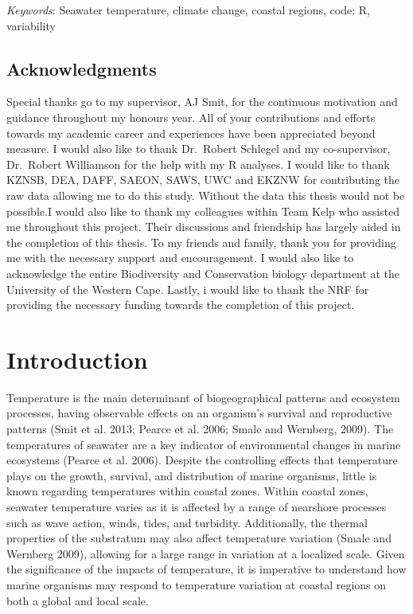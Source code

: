 \documentclass[12pt,]{article}
\begin{document}
\emph{Keywords}: Seawater temperature, climate change, coastal regions,
code: R, variability

\newpage

\subsection{Acknowledgments}\label{acknowledgments}

Special thanks go to my supervisor, AJ Smit, for the continuous
motivation and guidance throughout my honours year. All of your
contributions and efforts towards my academic career and experiences
have been appreciated beyond measure. I would also like to thank
Dr.~Robert Schlegel and my co-supervisor, Dr.~Robert Williamson for the
help with my R analyses. I would like to thank KZNSB, DEA, DAFF, SAEON,
SAWS, UWC and EKZNW for contributing the raw data allowing me to do this
study. Without the data this thesis would not be possible.I would also
like to thank my colleagues within Team Kelp who assisted me throughout
this project. Their discussions and friendship has largely aided in the
completion of this thesis. To my friends and family, thank you for
providing me with the necessary support and encouragement. I would also
like to acknowledge the entire Biodiversity and Conservation biology
department at the University of the Western Cape. Lastly, i would like
to thank the NRF for providing the necessary funding towards the
completion of this project.

\newpage

\section{Introduction}\label{introduction}

Temperature is the main determinant of biogeographical patterns and
ecosystem processes, having observable effects on an organism's survival
and reproductive patterns (Smit et al. 2013; Pearce et al. 2006; Smale
and Wernberg, 2009). The temperatures of seawater are a key indicator of
environmental changes in marine ecosystems (Pearce et al. 2006). Despite
the controlling effects that temperature plays on the growth, survival,
and distribution of marine organisms, little is known regarding
temperatures within coastal zones. Within coastal zones, seawater
temperature varies as it is affected by a range of nearshore processes
such as wave action, winds, tides, and turbidity. Additionally, the
thermal properties of the substratum may also affect temperature
variation (Smale and Wernberg 2009), allowing for a large range in
variation at a localized scale. Given the significance of the impacts of
temperature, it is imperative to understand how marine organisms may
respond to temperature variation at coastal regions on both a global and
local scale.
\end{document}
